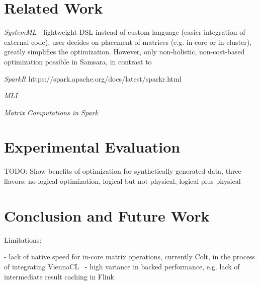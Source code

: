 \documentclass{article}
\begin{document}
\section{Related Work}

{\em SystemML} \cite{Ghoting2011} - lightweight DSL instead of custom language (easier integration of external code), user decides on placement of matrices (e.g. in-core or in cluster), greatly simplifies the optimization. However, only non-holistic, non-cost-based optimization possible in Samsara, in contrast to~\cite{Boehm2014}

{\em SparkR} https://spark.apache.org/docs/latest/sparkr.html

{\em MLI} \cite{Sparks2013}

{\em Matrix Computations in Spark} \cite{Zadeh2016}

\section{Experimental Evaluation}

TODO: Show benefits of optimization for synthetically generated data, three flavors: no logical optimization, logical but not physical, logical plus physical

\section{Conclusion and Future Work}

Limitations:

 - lack of native speed for in-core matrix operations, currently Colt, in the process of integrating ViennaCL~\cite{Tillet2013}
 - high variance in backed performance, e.g. lack of intermediate result caching in Flink



\end{document}
